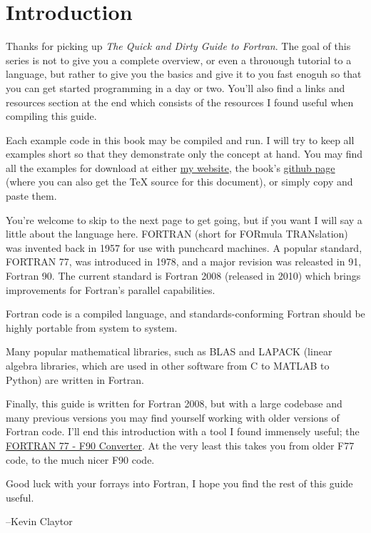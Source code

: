 \section{Introduction}

Thanks for picking up \emph{The Quick and Dirty Guide to Fortran}. 
The goal of this series is not to give you a complete overview, or even a throuough tutorial to a language,
 but rather to give you the basics and give it to you fast enoguh so that you can get started programming in a day or two. 
You'll also find a links and resources section at the end which consists of the resources I found useful when compiling this guide.

Each example code in this book may be compiled and run. I will try to keep all examples short so that they demonstrate only the concept at hand. 
You may find all the examples for download at either
 \href{http://http://people.duke.edu/~kec30/}{my website}, the book's
 \href{https://github.com/KEClaytor/QuickDirtyFortran}{github page} (where you can also get the TeX source for this document), or simply copy and paste them.

You're welcome to skip to the next page to get going, but if you want I will say a little about the language here.
FORTRAN (short for FORmula TRANslation) was invented back in 1957 for use with punchcard machines. 
A popular standard, FORTRAN 77, was introduced in 1978, and a major revision was releasted in 91, Fortran 90. 
The current standard is Fortran 2008 (released in 2010) which brings improvements for Fortran's parallel capabilities.

Fortran code is a compiled language, and standards-conforming Fortran should be highly portable from system to system.

Many popular mathematical libraries, such as BLAS and LAPACK (linear algebra libraries, which are used in other software from C to MATLAB to Python) are written in Fortran.

Finally, this guide is written for Fortran 2008, but with a large codebase and many previous versions you may find yourself
 working with older versions of Fortran code. 
I'll end this introduction with a tool I found immensely useful; the \href{http://www.polyhedron.com/plusfortonline.php}{FORTRAN 77 - F90 Converter}.
 At the very least this takes you from older F77 code, to the much nicer F90 code.

Good luck with your forrays into Fortran, I hope you find the rest of this guide useful.

    --Kevin Claytor